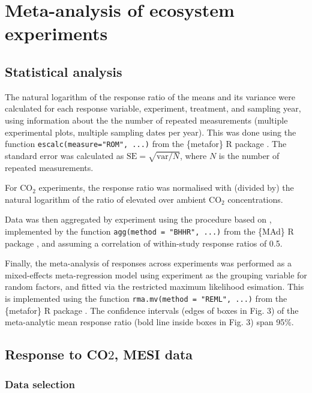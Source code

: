 \documentclass{myreport}
\begin{document}
\section{Meta-analysis of ecosystem experiments}

\subsection{Statistical analysis}
\label{sec:statisticalanalysis}

The natural logarithm of the response ratio of the means and its variance were calculated for each response variable, experiment, treatment, and sampling year, using information about the the number of repeated measurements (multiple experimental plots, multiple sampling dates per year). This was done using the function \texttt{escalc(measure="ROM", ...)} from the \{metafor\} R package \citep{viechtbauer_conducting_2010}. The standard error was calculated as $\text{SE} = \sqrt{\text{var}/N}$, where $N$ is the number of repeated measurements.

For CO$_2$ experiments, the response ratio was normalised with (divided by) the natural logarithm of the ratio of elevated over ambient CO$_2$ concentrations.

Data was then aggregated by experiment using the procedure based on \citet{borenstein_effect_2009}, implemented by the function \texttt{agg(method = "BHHR", ...)} from the \{MAd\} R package \citep{mad_r_package}, and assuming a correlation of within-study response ratios of 0.5.

Finally, the meta-analysis of responses across experiments was performed as a mixed-effects meta-regression model using experiment as the grouping variable for random factors, and fitted via the restricted maximum likelihood esimation. This is implemented using the function \texttt{rma.mv(method = "REML", ...)} from the \{metafor\} R package \citep{viechtbauer_conducting_2010}. The confidence intervals (edges of boxes in Fig. 3) of the meta-analytic mean response ratio (bold line inside boxes in Fig. 3) span 95\%. 


\subsection{Response to CO$2$, MESI data}

\subsubsection{Data selection}
\end{document}
